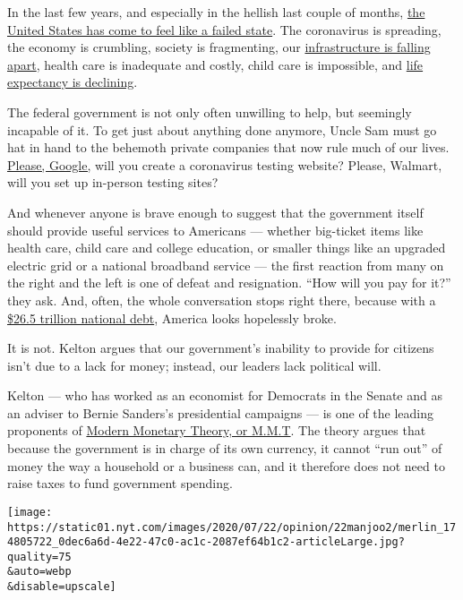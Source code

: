 In the last few years, and especially in the hellish last couple of
months,
\href{https://www.theatlantic.com/magazine/archive/2020/06/underlying-conditions/610261/}{the
United States has come to feel like a failed state}. The coronavirus is
spreading, the economy is crumbling, society is fragmenting, our
\href{https://www.businessinsider.com/asce-gives-us-infrastructure-a-d-2017-3\#bridges-c-2}{infrastructure
is falling apart}, health care is inadequate and costly, child care is
impossible, and
\href{https://www.nytimes.com/2019/11/26/health/life-expectancy-rate-usa.html}{life
expectancy is declining}.

The federal government is not only often unwilling to help, but
seemingly incapable of it. To get just about anything done anymore,
Uncle Sam must go hat in hand to the behemoth private companies that now
rule much of our lives.
\href{https://www.nytimes.com/2020/03/18/opinion/coronavirus-trump.html}{Please,
Google,} will you create a coronavirus testing website? Please, Walmart,
will you set up in-person testing sites?

And whenever anyone is brave enough to suggest that the government
itself should provide useful services to Americans --- whether
big-ticket items like health care, child care and college education, or
smaller things like an upgraded electric grid or a national broadband
service --- the first reaction from many on the right and the left is
one of defeat and resignation. ``How will you pay for it?'' they ask.
And, often, the whole conversation stops right there, because with a
\href{https://www.treasurydirect.gov/govt/reports/pd/pd_debttothepenny.htm}{\$26.5
trillion national debt}, America looks hopelessly broke.

It is not. Kelton argues that our government's inability to provide for
citizens isn't due to a lack for money; instead, our leaders lack
political will.

Kelton --- who has worked as an economist for Democrats in the Senate
and as an adviser to Bernie Sanders's presidential campaigns --- is one
of the leading proponents of
\href{https://www.vox.com/future-perfect/2019/4/16/18251646/modern-monetary-theory-new-moment-explained}{Modern
Monetary Theory, or M.M.T}. The theory argues that because the
government is in charge of its own currency, it cannot ``run out'' of
money the way a household or a business can, and it therefore does not
need to raise taxes to fund government spending.

\texttt{[image: https://static01.nyt.com/images/2020/07/22/opinion/22manjoo2/merlin\_174805722\_0dec6a6d-4e22-47c0-ac1c-2087ef64b1c2-articleLarge.jpg?quality=75\\\&auto=webp\\\&disable=upscale]}

